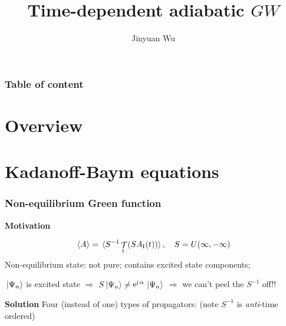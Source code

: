 \documentclass[t]{beamer}
\title{Time-dependent adiabatic $GW$}
\author{Jinyuan Wu}
\DeclareMathOperator{\ee}{e}
\DeclareMathOperator{\ii}{i}
\DeclareMathOperator{\timeorder}{\mathcal{T}}
\begin{document}
\maketitle

\begin{frame}
\frametitle{Table of content}

\tableofcontents    

\end{frame}

\section{Overview}

\section{Kadanoff-Baym equations}

\begin{frame}
\frametitle{Non-equilibrium Green function}

\textbf{Motivation} 

\begin{equation}
    \expval*{A} = \expval*{S^{-1} \timeorder_t ( S A_{\text{I}}(t) )}, \quad S = U(\infty, -\infty)
\end{equation}
Non-equilibrium state: not pure; contains excited state components;

$\ket*{\Psi_n}$ is excited state $\Rightarrow$ $S \ket*{\Psi_n} \neq \ee^{\ii \alpha} \ket*{\Psi_n}$
$\Rightarrow$ we can't peel the $S^{-1}$ off!!

\vspace{0.5cm}

\textbf{Solution} Four (instead of one) types of propagators: (note $S^{-1}$ is \emph{anti}-time ordered)

\begin{center}
    \small
        
\end{center}

\end{frame}
\end{document}
